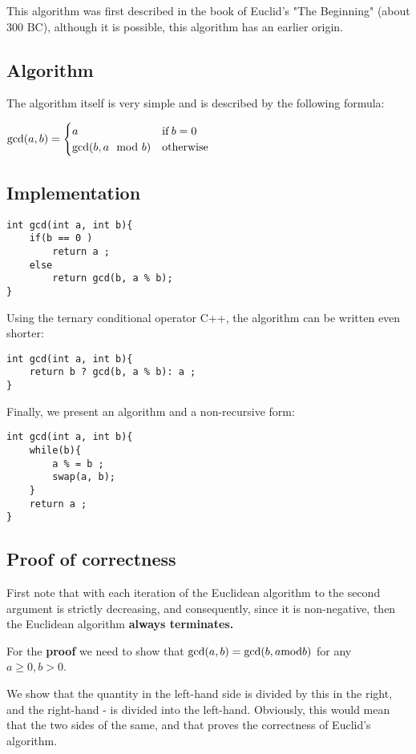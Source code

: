 This algorithm was first described in the book of Euclid's "The Beginning" (about 300 BC), although it is possible, this algorithm has an earlier origin.

\subsection{ Algorithm }

The algorithm itself is very simple and is described by the following formula:

$\gcd(a,b)=\begin{cases}
a & {\rm if\,}b=0\\
\gcd(b,a\mod b) & {\rm otherwise}
\end{cases}$

\subsection{ Implementation }

\begin{verbatim}
int gcd(int a, int b){
    if(b == 0 )
        return a ;
    else
        return gcd(b, a % b);
} 
\end{verbatim}
Using the ternary conditional operator C++, the algorithm can be written even shorter:

\begin{verbatim}
int gcd(int a, int b){
    return b ? gcd(b, a % b): a ;
} 
\end{verbatim}
Finally, we present an algorithm and a non-recursive form:

\begin{verbatim}
int gcd(int a, int b){
    while(b){
        a % = b ;
        swap(a, b);
    }
    return a ;
} 
\end{verbatim}
\subsection{ Proof of correctness }

First note that with each iteration of the Euclidean algorithm to the second argument is strictly decreasing, and consequently, since it is non-negative, then the Euclidean algorithm \textbf{always terminates.}

For the \textbf{proof} we need to show that ${\rm gcd} (a, b) = {\rm gcd} (b, a {\rm mod} b)$ for any $a \ge 0, b> 0$.

We show that the quantity in the left-hand side is divided by this in the right, and the right-hand - is divided into the left-hand. Obviously, this would mean that the two sides of the same, and that proves the correctness of Euclid's algorithm.

